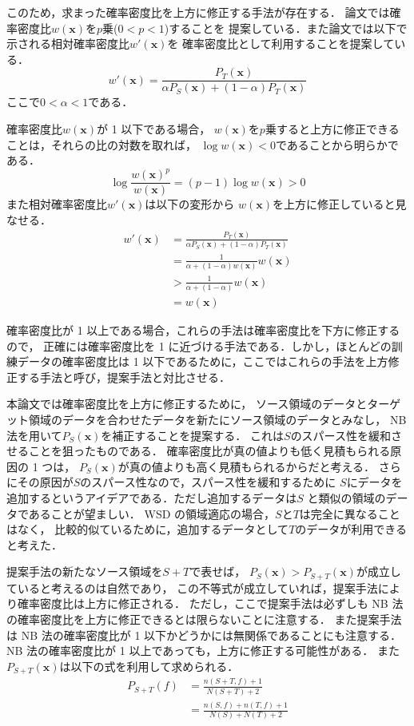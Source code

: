 \documentclass[japanese]{jnlp_1.4}
\begin{document}
このため，求まった確率密度比を上方に修正する手法が存在する．
論文\cite{sugiyama-2006-09-05}では確率密度比$w({\bm x})$を$p$乗($0 < p < 1$)することを
提案している．また論文\cite{yamada2011relative}では以下で示される相対確率密度比$w'({\bm x})$を
確率密度比として利用することを提案している．
\[
w'({\bm x}) = \frac{P_T({\bm x})}{\alpha P_S({\bm x}) + (1-\alpha) P_T({\bm x})}
\]
ここで$0 < \alpha < 1$である．

確率密度比$w({\bm x})$が 1 以下である場合，
$w({\bm x})$を$p$乗すると上方に修正できることは，それらの比の対数を取れば，
\mbox{$\log w({\bm x}) < 0$}であることから明らかである．
\[
\log \frac{w({\bm x})^p}{w({\bm x})} = (p - 1) \log w({\bm x}) > 0
\]
また相対確率密度比$w'({\bm x})$は以下の変形から
$w({\bm x})$を上方に修正していると見なせる．
\begin{align*}
w'({\bm x}) & = \frac{P_T({\bm x})}{\alpha P_S({\bm x}) + (1-\alpha) P_T({\bm x})}    \\
             & = \frac{1}{\alpha  + (1-\alpha) w({\bm x})} w({\bm x})\\
             & > \frac{1}{\alpha  + (1-\alpha)} w({\bm x})\\
             & = w({\bm x})
\end{align*}

確率密度比が 1 以上である場合，これらの手法は確率密度比を下方に修正するので，
正確には確率密度比を 1 に近づける手法である．しかし，ほとんどの訓練データの確率密度比は
1 以下であるために，ここではこれらの手法を上方修正する手法と呼び，提案手法と対比させる．

本論文では確率密度比を上方に修正するために，
ソース領域のデータとターゲット領域のデータを合わせたデータを新たにソース領域のデータとみなし，
NB 法を用いて$P_S({\bm x})$を補正することを提案する．
これは$S$のスパース性を緩和させることを狙ったものである．
確率密度比が真の値よりも低く見積もられる原因の 1 つは，
$P_S({\bm x})$が真の値よりも高く見積もられるからだと考える．
さらにその原因が$S$のスパース性なので，スパース性を緩和するために
$S$にデータを追加するというアイデアである．ただし追加するデータは$S$
と類似の領域のデータであることが望ましい．
WSD の領域適応の場合，$S$と$T$は完全に異なることはなく，
比較的似ているために，追加するデータとして$T$のデータが利用できると考えた．

提案手法の新たなソース領域を$S+T$で表せば，
$P_S ({\bm x}) >  P_{S+T} ({\bm x})$が成立していると考えるのは自然であり，
この不等式が成立していれば，提案手法により確率密度比は上方に修正される．
ただし，ここで提案手法は必ずしも NB 法の確率密度比を上方に修正できるとは限らないことに注意する．
また提案手法は NB 法の確率密度比が 1 以下かどうかには無関係であることにも注意する．
NB 法の確率密度比が 1 以上であっても，上方に修正する可能性がある．
また$P_{S+T} ({\bm x})$は以下の式を利用して求められる．
\begin{align*}
P_{S+T} (f) & = \frac{n(S+T,f) + 1}{N(S+T) + 2}  \\
           & = \frac{n(S,f) +n(T,f) + 1}{N(S) + N(T) + 2}
 \end{align*}
\end{document}
